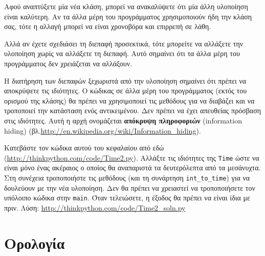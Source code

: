 \documentclass[10pt]{book}
\begin{document}
Αφού αναπτύξετε μία νέα κλάση, μπορεί να ανακαλύψετε ότι μία άλλη υλοποίηση είναι καλύτερη. Αν τα άλλα μέρη του
προγράμματος χρησιμοποιούν ήδη την κλάση σας, τότε η αλλαγή μπορεί να είναι χρονοβόρα και επιρρεπή σε λάθη.

Αλλά αν έχετε σχεδιάσει τη διεπαφή προσεκτικά, τότε μπορείτε να αλλάξετε την υλοποίηση χωρίς να αλλάξετε τη
διεπαφή. Αυτό σημαίνει ότι τα άλλα μέρη του προγράμματος δεν χρειάζεται να αλλάξουν.

Η διατήρηση των διεπαφών ξεχωριστά από την υλοποίηση σημαίνει ότι πρέπει να αποκρύψετε τις ιδιότητες.
Ο κώδικας σε άλλα μέρη του προγράμματος (εκτός του ορισμού της κλάσης) θα πρέπει να χρησιμοποιεί τις μεθόδους
για να διαβάζει και να τροποποιεί την κατάσταση ενός αντικειμένου. Δεν πρέπει να έχει απευθείας πρόσβαση στις
ιδιότητες. Αυτή η αρχή ονομάζεται {\bf απόκρυψη πληροφοριών} (information hiding) (βλ.\url{http://en.wikipedia.org/wiki/Information_hiding}).
\\

\begin{exercise}

Κατεβάστε τον κώδικα αυτού του κεφαλαίου από εδώ (\url{http://thinkpython.com/code/Time2.py}).
Αλλάξτε τις ιδιότητες της {\tt Time} ώστε να είναι μόνο ένας ακέραιος ο οποίος θα αναπαριστά
τα δευτερόλεπτα από τα μεσάνυχτα. Στη συνέχεια τροποποιήστε τις μεθόδους (και τη συνάρτηση \verb"int_to_time")
για να δουλεύουν με την νέα υλοποίηση. Δεν θα πρέπει να χρειαστεί να τροποποιήσετε τον υπόλοιπο κώδικα στην
{\tt main}. Όταν τελειώσετε, η έξοδος θα πρέπει να είναι ίδια με πριν. Λύση:
\url{http://thinkpython.com/code/Time2_soln.py}
\end{exercise}


 
\section{Ορολογία}
\end{document}
